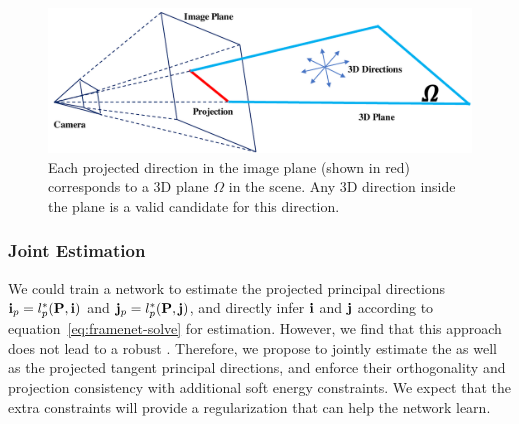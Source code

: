 \begin{figure}
    \centering
     \includegraphics[width=0.8\linewidth]{FrameNet/graph/projection.pdf}
     \caption{Each projected direction in the image plane (shown in red) corresponds to a 3D plane $\Omega$ in the scene. Any 3D direction inside the plane is a valid candidate for this direction.}
    \label{fig:framenet-dir-constraint}
\vspace{-0.2in}
\end{figure}
    \vspace{-0.1in}
\subsubsection{Joint Estimation}
\label{sec:framenet-network}
We could train a network to estimate the projected principal directions $\mathbf{i}_p=l_p^*(\textbf{P},\textbf{i})$ and $\mathbf{j}_p=l_p^*(\textbf{P},\textbf{j})$, and directly infer $\mathbf{i}$ and $\mathbf{j}$ according to equation~\ref{eq:framenet-solve} for \cframe{} estimation. However, we find that this approach does not lead to a robust \cframe{}. Therefore, we propose to jointly estimate the \cframe{} as well as the projected tangent principal directions, and enforce their orthogonality and projection consistency with additional soft energy constraints.  We expect that the extra constraints will provide a regularization that can help the network learn.

